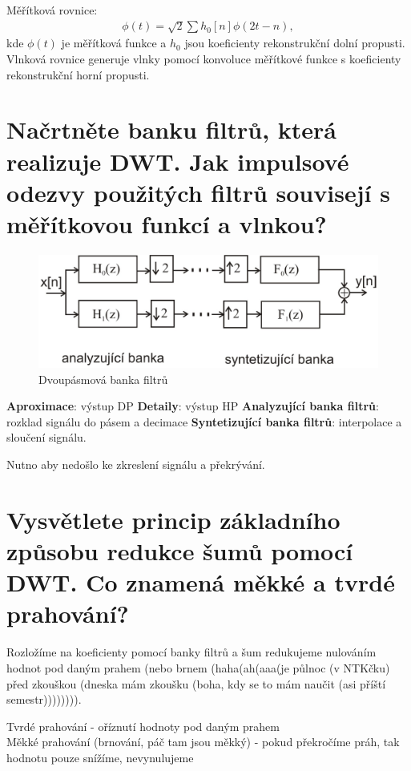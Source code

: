 \documentclass[a4paper,12pt]{article}   %
\newcommand{\mt}[1]{$#1$}
\begin{document}
Měřítková rovnice:
\begin{align*}
        \phi(t) = \sqrt{2} \sum h_0[n]\phi(2t-n),
\end{align*}
kde \mt{\phi (t)} je měřítková funkce a \mt{h_0} jsou koeficienty rekonstrukční dolní propusti. Vlnková rovnice generuje vlnky pomocí konvoluce měřítkové funkce s koeficienty rekonstrukční horní propusti. 


\section{Načrtněte banku filtrů, která realizuje DWT. Jak impulsové odezvy použitých filtrů souvisejí s měřítkovou funkcí a vlnkou?}
\begin{figure}
        \centering
        \includegraphics[width=.6\textwidth]{fig/banka_filtru.png}
        \caption*{Dvoupásmová banka filtrů}
\end{figure}

\begin{outline}
        \1 \textbf{Aproximace}: výstup DP 
        \1 \textbf{Detaily}: výstup HP
        \1 \textbf{Analyzující banka filtrů}: rozklad signálu do pásem a decimace
        \1 \textbf{Syntetizující banka filtrů}: interpolace a sloučení signálu.
\end{outline}

Nutno aby nedošlo ke zkreslení signálu a překrývání. 


\section{Vysvětlete princip základního způsobu redukce šumů pomocí DWT. Co znamená měkké a tvrdé prahování?}

Rozložíme na koeficienty pomocí banky filtrů a šum redukujeme nulováním hodnot pod daným prahem (nebo brnem (haha(ah(aaa(je půlnoc (v NTKčku) před zkouškou (dneska mám zkoušku (boha, kdy se to mám naučit (asi příští semestr)))))))). 

Tvrdé prahování - oříznutí hodnoty pod daným prahem\\
Měkké prahování (brnování, páč tam jsou měkký) - pokud překročíme práh, tak hodnotu pouze snížíme, nevynulujeme
\end{document}
